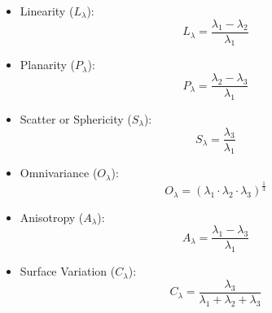 \begin{itemize}
    \item Linearity (\( L_{\lambda} \)):
    \begin{equation}
        L_{\lambda} = \frac{\lambda_1 - \lambda_2}{\lambda_1}
    \end{equation}
    
    \item Planarity (\( P_{\lambda} \)):
    \begin{equation}
        P_{\lambda} = \frac{\lambda_2 - \lambda_3}{\lambda_1}
    \end{equation}
    
    \item Scatter or Sphericity (\( S_{\lambda} \)):
    \begin{equation}
        S_{\lambda} = \frac{\lambda_3}{\lambda_1}
    \end{equation}
    
    \item Omnivariance (\( O_{\lambda} \)):
    \begin{equation}
        O_{\lambda} = \left( \lambda_1 \cdot \lambda_2 \cdot \lambda_3 \right)^{\frac{1}{3}}
    \end{equation}
    
    \item Anisotropy (\( A_{\lambda} \)):
    \begin{equation}
        A_{\lambda} = \frac{\lambda_1 - \lambda_3}{\lambda_1}
    \end{equation}
    
    \item Surface Variation \parencite{rusu2009semantic} (\( C_{\lambda} \)):
    \begin{equation}\label{eq:surf_var}
        C_{\lambda} = \frac{\lambda_3}{\lambda_1 + \lambda_2 + \lambda_3}
    \end{equation}
    
\end{itemize}

